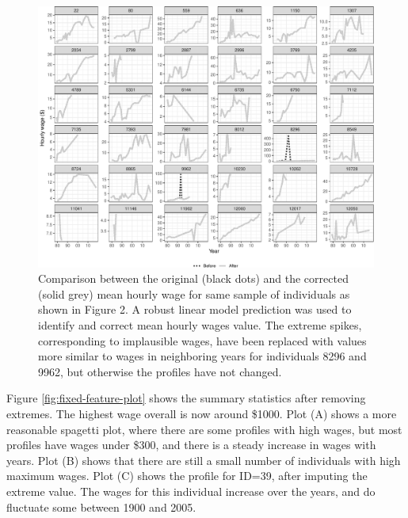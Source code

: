 \documentclass{article}
\begin{document}
\begin{figure}

{\centering \includegraphics[width=0.9\linewidth]{figures/compare-plot-1} 

}

\caption{Comparison between the original (black dots) and the corrected (solid grey) mean hourly wage for same sample of individuals as shown in Figure 2. A robust linear model prediction was used to identify and correct mean hourly wages value. The extreme spikes, corresponding to implausible wages, have been replaced with values more similar to wages in neighboring years for individuals 8296 and 9962, but otherwise the profiles have not changed.}\label{fig:compare-plot}
\end{figure}

Figure \ref{fig:fixed-feature-plot} shows the summary statistics after removing extremes. The highest wage overall is now around \$1000. Plot (A) shows a more reasonable spagetti plot, where there are some profiles with high wages, but most profiles have wages under \$300, and there is a steady increase in wages with years. Plot (B) shows that there are still a small number of individuals with high maximum wages. Plot (C) shows the profile for ID=39, after imputing the extreme value. The wages for this individual increase over the years, and do fluctuate some between 1900 and 2005.
\end{document}
